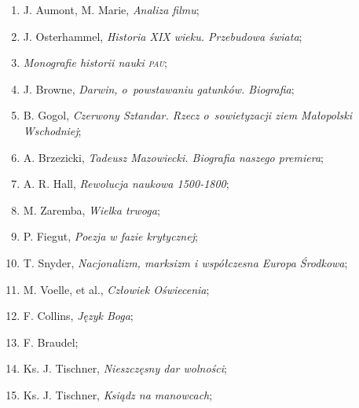 \documentclass[a4paper,11pt]{article}
\begin{document}
\begin{enumerate}
\item J. Aumont, M. Marie, \textit{Analiza filmu};



\item J. Osterhammel, \textit{Historia XIX wieku. Przebudowa świata};



\item \textit{Monografie historii nauki \textsc{pau}};



\item J. Browne, \textit{Darwin, o~powstawaniu gatunków. Biografia};



\item B. Gogol, \textit{Czerwony Sztandar. Rzecz o~sowietyzacji ziem
    Małopolski Wschodniej};



\item A. Brzezicki, \textit{Tadeusz Mazowiecki. Biografia naszego
    premiera};



\item A. R. Hall, \textit{Rewolucja naukowa 1500-1800};



\item M. Zaremba, \textit{Wielka trwoga};



\item P. Fiegut, \textit{Poezja w fazie krytycznej};



\item T. Snyder, \textit{Nacjonalizm, marksizm i współczesna Europa
    Środkowa};



\item M. Voelle, et al., \textit{Człowiek Oświecenia};



\item F. Collins, \textit{Język Boga};



\item F. Braudel;



\item Ks. J. Tischner, \textit{Nieszczęsny dar wolności};



\item Ks. J. Tischner, \textit{Ksiądz na manowcach};




\end{enumerate}
\end{document}
